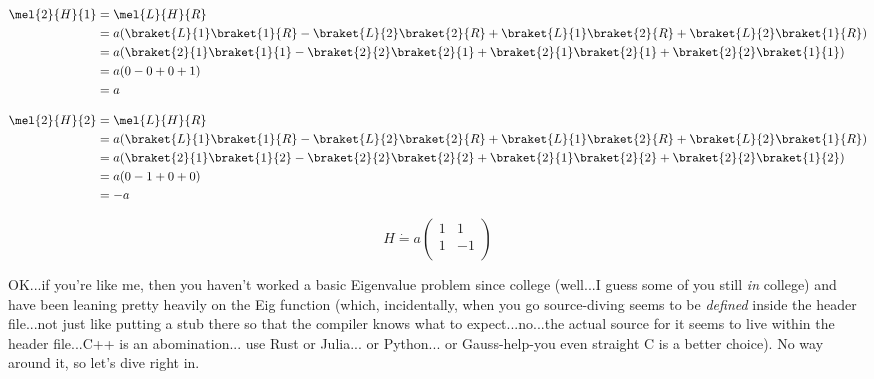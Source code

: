 \begin{answer}
  \begin{equation}
    \begin{split}
      \mel{2}{H}{1}
      &= \mel{L}{H}{R}\\
      &=a(
      \braket{L}{1}\braket{1}{R}
      - \braket{L}{2}\braket{2}{R}
      + \braket{L}{1}\braket{2}{R}
      + \braket{L}{2}\braket{1}{R}
      )
      \\
      &=a(
      \braket{2}{1}\braket{1}{1}
      - \braket{2}{2}\braket{2}{1}
      + \braket{2}{1}\braket{2}{1}
      + \braket{2}{2}\braket{1}{1}
      )
      \\
      &=
      a(
      0
      - 0
      + 0
      + 1
      )
      \\
      &= a
    \end{split}
  \end{equation}

  \begin{equation}
    \begin{split}
      \mel{2}{H}{2}
      &= \mel{L}{H}{R}\\
      &=a(
      \braket{L}{1}\braket{1}{R}
      - \braket{L}{2}\braket{2}{R}
      + \braket{L}{1}\braket{2}{R}
      + \braket{L}{2}\braket{1}{R}
      )
      \\
      &=a(
      \braket{2}{1}\braket{1}{2}
      - \braket{2}{2}\braket{2}{2}
      + \braket{2}{1}\braket{2}{2}
      + \braket{2}{2}\braket{1}{2}
      )
      \\
      &=
      a(
      0
      - 1
      + 0
      + 0
      )
      \\
      &= -a
    \end{split}
  \end{equation}

  \begin{equation}
    H \dot{=}
    a\begin{pmatrix}
      1 & 1\\
      1 & -1\\
    \end{pmatrix}
  \end{equation}

  OK...if you're like me, then you haven't worked a basic Eigenvalue
  problem since college (well...I guess some of you still \emph{in}
  college) and have been leaning pretty heavily on the Eig function
  (which, incidentally, when you go source-diving seems to be
  \emph{defined} inside the header file...not just like putting a stub
  there so that the compiler knows what to expect...no...the actual
  source for it seems to live within the header file...C++ is an
  abomination... use Rust or Julia... or Python... or Gauss-help-you even
  straight C is a better choice).  No way around it, so let's dive
  right in.


\end{answer}
